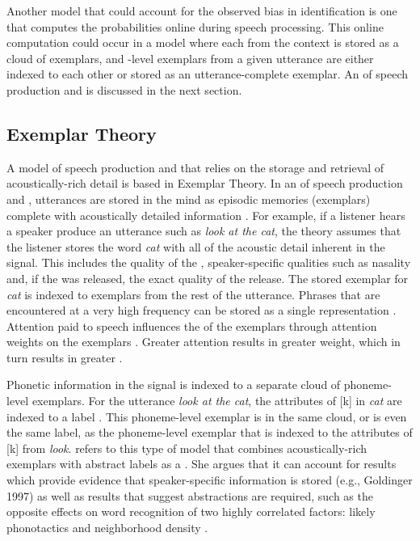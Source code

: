 Another model that could account for the observed bias in  identification is one that computes the probabilities online during speech processing.  This online computation could occur in a model where each  from the context is stored as a cloud of exemplars, and -level exemplars from a given utterance are either indexed to each other or stored as an utterance-complete exemplar.  An  of speech production and  is discussed in the next section.


\subsection{Exemplar Theory}\label{exemplar}

A model of speech production and  that relies on the storage and retrieval of acoustically-rich detail is based in Exemplar Theory.  In an  of speech production and , utterances are stored in the mind as episodic memories (exemplars) \citep{pisoni1997} complete with acoustically detailed information \citep{goldinger1997,pierrehumbert2001,pierrehumbert2002}.  For example, if a listener hears a speaker produce an utterance such as \textit{look at the cat}, the theo\-ry assumes that the listener stores the word \textit{cat} with all of the acoustic detail inherent in the signal.  This includes the quality of the , speaker-specific quali\-ties such as nasality and, if the  was released, the exact quality of the release.  The stored exemplar for \textit{cat} is indexed to exemplars from the rest of the utte\-rance.  Phrases that are encountered at a very high frequency can be stored as a single representation \citep{bybee2006}. Attention paid to speech influences the  of the exemplars through attention weights on the exemplars \citep{nosofsky1986}.  Greater attention results in greater weight, which in turn results in greater .  

Phonetic information in the signal is indexed to a separate cloud of phoneme-level exemplars.  For the utterance \textit{look at the cat}, the attributes of [k] in \textit{cat} are indexed to a label .  This phoneme-level exemplar is in the same cloud, or is even the same label, as the phoneme-level exemplar  that is indexed to the attributes of [k] from \textit{look}.  \citet{pierrehumbert2006} refers to this type of model that combines acoustically-rich exemplars with abstract labels as a .  She argues that it can account for results which provide evidence that speaker-specific information is stored (e.g., Goldinger 1997) as well as results that suggest abstractions are required, such as the opposite effects on word recognition of two highly correlated factors: likely phonotactics and neighborhood density \citep{vitevitchluce1999}.  


